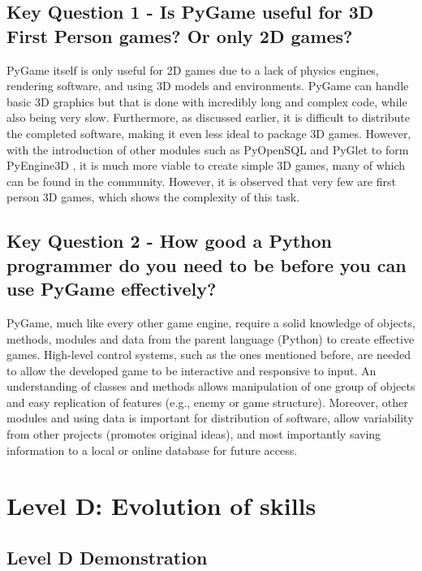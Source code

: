 \documentclass[a4paper, 11pt]{report}
\begin{document}
\subsection{Key Question 1 - Is PyGame useful for 3D First Person games? Or only 2D games?}
PyGame itself is only useful for 2D games due to a lack of physics engines, rendering software, and using 3D models and environments. PyGame can handle basic 3D graphics but that is done with incredibly long and complex code, while also being very slow. Furthermore, as discussed earlier, it is difficult to distribute the completed software, making it even less ideal to package 3D games. However, with the introduction of other modules such as PyOpenSQL and PyGlet to form PyEngine3D \cite{pygame_3d}, it is much more viable to create simple 3D games, many of which can be found in the community. However, it is observed that very few are first person 3D games, which shows the complexity of this task.

\subsection{Key Question 2 - How good a Python programmer do you need to be before you can use PyGame effectively?}
PyGame, much like every other game engine, require a solid knowledge of objects, methods, modules and data from the parent language (Python) to create effective games. High-level control systems, such as the ones mentioned before, are needed to allow the developed game to be interactive and responsive to input. An understanding of classes and methods allows manipulation of one group of objects and easy replication of features (e.g., enemy or game structure). Moreover, other modules and using data is important for distribution of software, allow variability from other projects (promotes original ideas), and most importantly saving information to a local or online database for future access.\cite{pygame_python}



\newpage
\section{Level D: Evolution of skills}
\vspace{5mm}
\subsection{Level D Demonstration}
\end{document}
